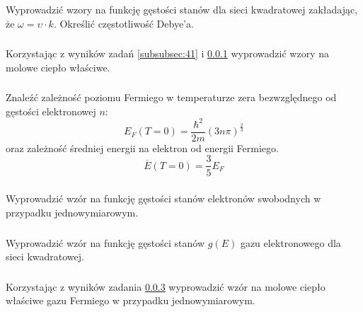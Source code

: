 \subsubsection{}
\label{subsubsec:42}
Wyprowadzić wzory na funkcję gęstości stanów dla sieci kwadratowej zakładając, że $\omega = \upsilon \cdot k$. Określić częstotliwość Debye'a.


\subsubsection{}
Korzystając z wyników zadań \ref{subsubsec:41} i \ref{subsubsec:42} wyprowadzić wzory na molowe ciepło właściwe.


\subsubsection{}
\label{subsubsec:44}
Znaleźć zależność poziomu Fermiego w temperaturze zera bezwzględnego od gęstości elektronowej $n$:
\[E_F(T=0) = \frac{\hbar^2}{2m}(3n\pi)^{\frac{2}{3}}\]
oraz zależność średniej energii na elektron od energii Fermiego.
\[ \overline{E}(T=0) = \frac{3}{5}E_F \]


\subsubsection{}
Wyprowadzić wzór na funkcję gęstości stanów elektronów swobodnych w przypadku jednowymiarowym.


\subsubsection{}
Wyprowadzić wzór na funkcję gęstości stanów $g(E)$  gazu elektronowego dla sieci kwadratowej.


\subsubsection{}
Korzystając z wyników zadania \ref{subsubsec:44} wyprowadzić wzór na molowe ciepło właściwe gazu Fermiego w przypadku jednowymiarowym.
